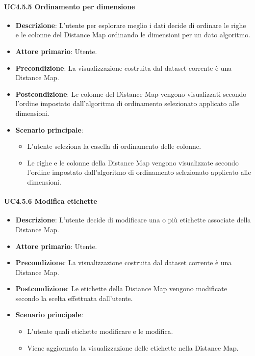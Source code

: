 \paragraph{UC4.5.5 Ordinamento per dimensione}
\label{par:uc4.5.5}
\begin{itemize}
    \item \textbf{Descrizione}: L'utente per esplorare meglio i dati decide di ordinare le righe e le colonne del Distance Map ordinando le dimensioni per un dato algoritmo.
    \item \textbf{Attore primario}: Utente.
    \item \textbf{Precondizione}: La visualizzazione costruita dal dataset corrente è una Distance Map.
    \item \textbf{Postcondizione}: Le colonne del Distance Map vengono visualizzati secondo l'ordine impostato dall'algoritmo di ordinamento selezionato applicato alle dimensioni.
    \item \textbf{Scenario principale}: 
    \begin{itemize}
        \item L'utente seleziona la casella di ordinamento delle colonne.
        \item Le righe e le colonne della Distance Map vengono visualizzate secondo l'ordine impostato dall'algoritmo di ordinamento selezionato applicato alle dimensioni.
    \end{itemize}
\end{itemize}


\paragraph{UC4.5.6 Modifica etichette}
\label{par:uc4.5.6}
\begin{itemize}
    \item \textbf{Descrizione}: L'utente decide di modificare una o più etichette associate della Distance Map.
    \item \textbf{Attore primario}: Utente.
    \item \textbf{Precondizione}: La visualizzazione costruita dal dataset corrente è una Distance Map.
    \item \textbf{Postcondizione}: Le etichette della Distance Map vengono modificate secondo la scelta effettuata dall'utente.
    \item \textbf{Scenario principale}:
    \begin{itemize}
        \item L'utente quali etichette modificare e le modifica.
        \item Viene aggiornata la visualizzazione delle etichette nella Distance Map.
    \end{itemize}
\end{itemize}



